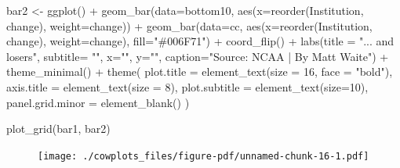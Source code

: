 \documentclass[
  letterpaper,
  DIV=11,
  numbers=noendperiod]{scrreprt}
\newenvironment{Shaded}{\begin{snugshade}}{\end{snugshade}}
\newcommand{\AttributeTok}[1]{\textcolor[rgb]{0.40,0.45,0.13}{#1}}
\newcommand{\DecValTok}[1]{\textcolor[rgb]{0.68,0.00,0.00}{#1}}
\newcommand{\FunctionTok}[1]{\textcolor[rgb]{0.28,0.35,0.67}{#1}}
\newcommand{\NormalTok}[1]{\textcolor[rgb]{0.00,0.23,0.31}{#1}}
\newcommand{\OtherTok}[1]{\textcolor[rgb]{0.00,0.23,0.31}{#1}}
\newcommand{\SpecialCharTok}[1]{\textcolor[rgb]{0.37,0.37,0.37}{#1}}
\newcommand{\StringTok}[1]{\textcolor[rgb]{0.13,0.47,0.30}{#1}}
\begin{document}
\begin{Shaded}
\begin{Highlighting}[]
\NormalTok{bar2 }\OtherTok{\textless{}{-}} \FunctionTok{ggplot}\NormalTok{() }\SpecialCharTok{+} 
  \FunctionTok{geom\_bar}\NormalTok{(}\AttributeTok{data=}\NormalTok{bottom10, }\FunctionTok{aes}\NormalTok{(}\AttributeTok{x=}\FunctionTok{reorder}\NormalTok{(Institution, change), }\AttributeTok{weight=}\NormalTok{change)) }\SpecialCharTok{+} 
  \FunctionTok{geom\_bar}\NormalTok{(}\AttributeTok{data=}\NormalTok{cc, }\FunctionTok{aes}\NormalTok{(}\AttributeTok{x=}\FunctionTok{reorder}\NormalTok{(Institution, change), }\AttributeTok{weight=}\NormalTok{change), }\AttributeTok{fill=}\StringTok{"\#006F71"}\NormalTok{) }\SpecialCharTok{+} 
  \FunctionTok{coord\_flip}\NormalTok{() }\SpecialCharTok{+}  
  \FunctionTok{labs}\NormalTok{(}\AttributeTok{title =} \StringTok{"... and losers"}\NormalTok{, }\AttributeTok{subtitle=} \StringTok{""}\NormalTok{, }\AttributeTok{x=}\StringTok{""}\NormalTok{, }\AttributeTok{y=}\StringTok{""}\NormalTok{,  }\AttributeTok{caption=}\StringTok{"Source: NCAA | By Matt Waite"}\NormalTok{) }\SpecialCharTok{+} 
  \FunctionTok{theme\_minimal}\NormalTok{() }\SpecialCharTok{+} 
  \FunctionTok{theme}\NormalTok{(}
    \AttributeTok{plot.title =} \FunctionTok{element\_text}\NormalTok{(}\AttributeTok{size =} \DecValTok{16}\NormalTok{, }\AttributeTok{face =} \StringTok{"bold"}\NormalTok{),}
    \AttributeTok{axis.title =} \FunctionTok{element\_text}\NormalTok{(}\AttributeTok{size =} \DecValTok{8}\NormalTok{), }
    \AttributeTok{plot.subtitle =} \FunctionTok{element\_text}\NormalTok{(}\AttributeTok{size=}\DecValTok{10}\NormalTok{), }
    \AttributeTok{panel.grid.minor =} \FunctionTok{element\_blank}\NormalTok{()}
\NormalTok{    )}
\end{Highlighting}
\end{Shaded}

\begin{Shaded}
\begin{Highlighting}[]
\FunctionTok{plot\_grid}\NormalTok{(bar1, bar2) }
\end{Highlighting}
\end{Shaded}

\begin{figure}[H]

{\centering \texttt{[image: ./cowplots\_files/figure-pdf/unnamed-chunk-16-1.pdf]}

}

\end{figure}
\end{document}
